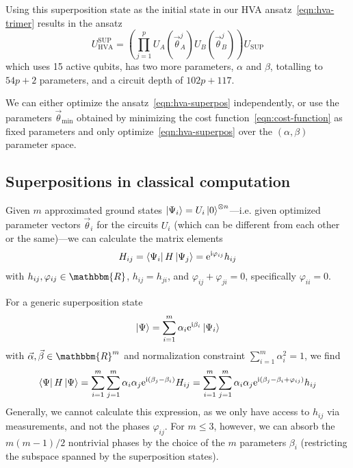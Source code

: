 \documentclass[a4paper,12pt]{article}
\newcommand{\rme}{\mathrm{e}}
\newcommand{\rmi}{\mathrm{i}}
\newcommand{\R}{\mathbbm{R}}
\begin{document}
Using this superposition state as the initial state in our HVA ansatz~\eqref{eqn:hva-trimer} results in the ansatz
\begin{equation}\label{eqn:hva-superpos}
 U_\text{HVA}^\text{SUP}
= \left(\prod_{j=1}^{p}
U_A(\vec \theta_A^j)
U_B(\vec \theta_B^j)
\right) U_\text{SUP}
\end{equation}
which uses 15 active qubits, has two more parameters, $\alpha$ and $\beta$, totalling to $54p + 2$ parameters, and a circuit depth of $102p + 117$.

We can either optimize the ansatz~\eqref{eqn:hva-superpos} independently, or use the parameters $\vec\theta_\text{min}$ obtained by minimizing the cost function~\eqref{eqn:cost-function} as fixed parameters and only optimize~\eqref{eqn:hva-superpos} over the $(\alpha,\beta)$ parameter space.


\subsection{Superpositions in classical computation}
Given $m$ approximated ground states $\left\vert{\Psi_i}\right\rangle = U_i \left\vert{0}\right\rangle^{\otimes n}$---i.e. given optimized parameter vectors $\vec{\theta}_i$ for the circuits $U_i$ (which can be different from each other or the same)---we can calculate the matrix elements
\begin{equation}
 H_{ij} = \bra{\Psi_i} H \ket{\Psi_j}
 = \rme^{\rmi \varphi_{ij}} h_{ij}
\end{equation}
with $h_{ij}, \varphi_{ij} \in \R$, $h_{ij} = h_{ji}$, and $\varphi_{ij} + \varphi_{ji} = 0$, specifically $\varphi_{ii} = 0$.

For a generic superposition state
\begin{equation}
 \ket{\Psi} = \sum_{i=1}^m \alpha_i \rme^{\rmi \beta_i} \ket{\Psi_i}
\end{equation}
with $\vec\alpha, \vec\beta \in \R^m$ and normalization constraint $\sum_{i=1}^m \alpha_i^2 = 1$, we find
\begin{equation}
 \bra{\Psi} H \ket{\Psi} 
 = \sum_{i=1}^m \sum_{j=1}^m \alpha_i \alpha_j \rme^{\rmi(\beta_j-\beta_i)} H_{ij}
 = \sum_{i=1}^m \sum_{j=1}^m \alpha_i \alpha_j \rme^{\rmi(\beta_j-\beta_i+\varphi_{ij})} h_{ij}
\end{equation}
Generally, we cannot calculate this expression, as we only have access to $h_{ij}$ via measurements, and not the phases $\varphi_{ij}$. For $m \leq 3$, however, we can absorb the $m(m-1)/2$ nontrivial phases by the choice of the $m$ parameters $\beta_i$ (restricting the subspace spanned by the superposition states).
\end{document}
